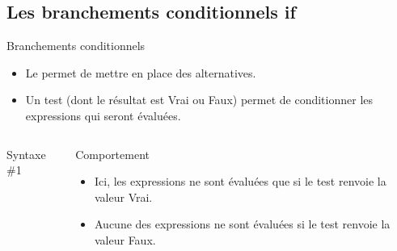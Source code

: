 \subsection{Les branchements conditionnels if}
\begin{frame}{}
  \begin{block}{Branchements conditionnels}
    \begin{itemize}
    \item Le  permet de mettre en place des alternatives.
    \item Un test (dont le résultat est Vrai ou Faux) permet de conditionner les expressions qui seront évaluées.
    \end{itemize}
  \end{block}\vrule
  \begin{columns}
    \begin{column}{6cm}
      \begin{block}{Syntaxe \#1}
      \end{block}
    \end{column}
    \begin{column}{5cm}
      \begin{block}{Comportement}
        \begin{itemize}
        \item Ici, les expressions ne sont évaluées que si le test renvoie la valeur Vrai.\\
        \item Aucune des expressions ne sont évaluées si le test renvoie la valeur Faux.
        \end{itemize}
      \end{block}
    \end{column}
  \end{columns}
\end{frame}
